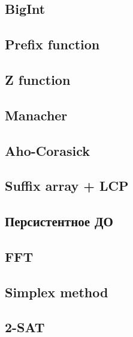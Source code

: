 \documentclass[10pt]{article}
\begin{document}
\begin{multicols}{2}
\subsection{BigInt}

\subsection{Prefix function}

\subsection{Z function}

\subsection{Manacher}

\subsection{Aho-Corasick}

\subsection{Suffix array + LCP}

\subsection{Персистентное ДО}

\subsection{FFT}

\subsection{Simplex method}

\subsection{2-SAT}

\end{multicols}
\newpage
\end{document}
